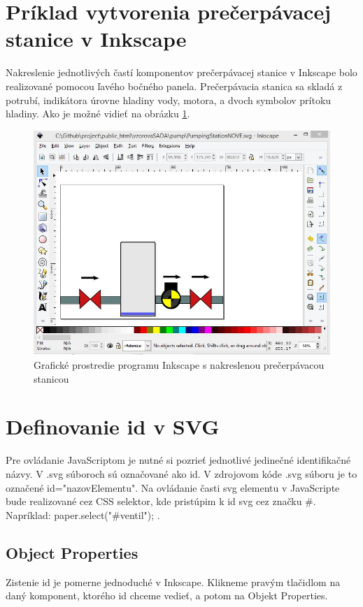 \section{Príklad vytvorenia prečerpávacej stanice v Inkscape}

Nakreslenie jednotlivých častí komponentov prečerpávacej stanice v Inkscape bolo realizované pomocou ľavého bočného panela. Prečerpávacia stanica sa skladá z potrubí, indikátora úrovne hladiny vody, motora, a dvoch symbolov prítoku hladiny. Ako je možné vidieť na obrázku  \ref{picture1}.  


\begin{figure}[H]
	\begin{center}
		\includegraphics[width=0.7\linewidth] {obrazky/pump1.jpg}
		\caption{Grafické prostredie programu Inkscape s nakreslenou prečerpávacou stanicou}
		\label{picture1}
	\end{center}
\end{figure}


\section{Definovanie id v SVG}

Pre ovládanie JavaScriptom je nutné si pozrieť jednotlivé jedinečné identifikačné názvy. V .svg súboroch sú označované ako id. V zdrojovom kóde .svg súboru je to označené id="nazovElementu". Na ovládanie časti svg elementu v JavaScripte bude realizované cez CSS selektor, kde pristúpim k id svg cez značku \#.  Napríklad: paper.select("\#ventil"); .


\subsection{Object Properties}
Zistenie id je pomerne jednoduché v Inkscape. Klikneme pravým tlačidlom na daný komponent, ktorého id chceme vedieť, a potom na Objekt Properties.

